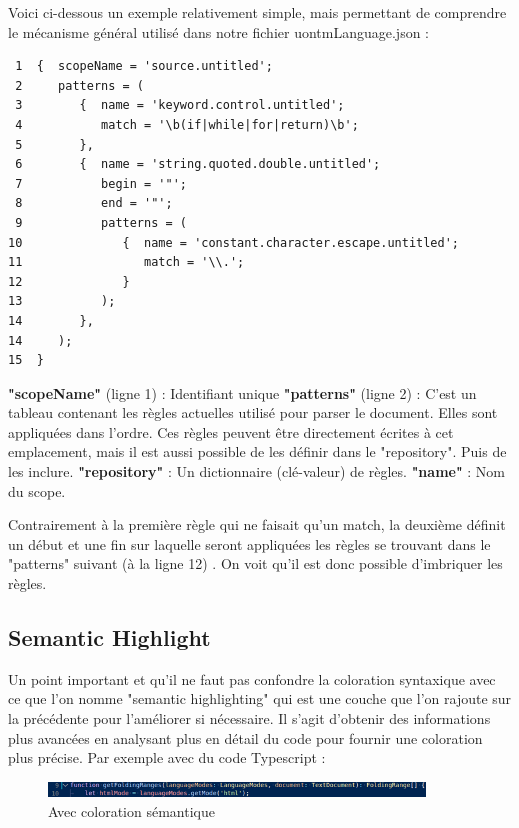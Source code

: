 \documentclass[
    iict, %
    il, %
]{heig-tb}
\begin{document}
Voici ci-dessous un exemple relativement simple, mais permettant de comprendre le mécanisme général utilisé dans notre fichier uontmLanguage.json :
\begin{lstlisting}
 1  {  scopeName = 'source.untitled';
 2     patterns = (
 3        {  name = 'keyword.control.untitled';
 4           match = '\b(if|while|for|return)\b';
 5        },
 6        {  name = 'string.quoted.double.untitled';
 7           begin = '"';
 8           end = '"';
 9           patterns = (
10              {  name = 'constant.character.escape.untitled';
11                 match = '\\.';
12              }
13           );
14        },
14     );
15  }
\end{lstlisting}

\textbf{"scopeName"} (ligne 1) : Identifiant unique
\textbf{"patterns"} (ligne 2) : C'est un tableau contenant les règles actuelles utilisé pour parser le document. Elles sont appliquées dans l'ordre.
Ces règles peuvent être directement écrites à cet emplacement, mais il est aussi possible de les définir dans le "repository". Puis de les inclure.
\textbf{"repository"} : Un dictionnaire (clé-valeur) de règles.
\textbf{"name"} : Nom du scope.

Contrairement à la première règle qui ne faisait qu'un match, la deuxième définit un début et une fin sur laquelle seront appliquées les règles se trouvant dans le "patterns" suivant (à la ligne 12) . On voit qu'il est donc possible d'imbriquer les règles.

\subsection{Semantic Highlight}

Un point important et qu'il ne faut pas confondre la coloration syntaxique avec ce que l'on nomme "semantic highlighting" qui est une couche que l'on rajoute sur la précédente pour l'améliorer si nécessaire.
Il s'agit d'obtenir des informations plus avancées en analysant plus en détail du code pour fournir une coloration plus précise.
Par exemple avec du code Typescript :

\begin{figure}[!ht]
    \begin{center}
        \includegraphics[width=10cm]{assets/figures/semantic-coloration-with.png}
    \end{center}
    \caption[Avec coloration sémantique ]{\label{semantic-coloration-with} Avec coloration sémantique }
\end{figure}
\end{document}
